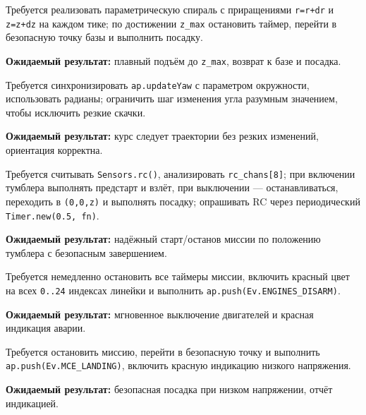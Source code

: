 \begin{taskbox}
Требуется реализовать параметрическую спираль с приращениями \texttt{r=r+dr} и \texttt{z=z+dz} на каждом тике; по достижении \texttt{z\_max} остановить таймер, перейти в безопасную точку базы и выполнить посадку.

\textbf{Ожидаемый результат:} плавный подъём до \texttt{z\_max}, возврат к базе и посадка.
\end{taskbox}

\begin{taskbox}
Требуется синхронизировать \texttt{ap.updateYaw} с параметром окружности, использовать радианы; ограничить шаг изменения угла разумным значением, чтобы исключить резкие скачки.

\textbf{Ожидаемый результат:} курс следует траектории без резких изменений, ориентация корректна.
\end{taskbox}

\begin{taskbox}
Требуется считывать \texttt{Sensors.rc()}, анализировать \texttt{rc\_chans[8]}; при включении тумблера выполнять предстарт и взлёт, при выключении — останавливаться, переходить в \texttt{(0,0,z)} и выполнять посадку; опрашивать RC через периодический \texttt{Timer.new(0.5, fn)}.

\textbf{Ожидаемый результат:} надёжный старт/останов миссии по положению тумблера с безопасным завершением.
\end{taskbox}

\begin{taskbox}
Требуется немедленно остановить все таймеры миссии, включить красный цвет на всех \texttt{0..24} индексах линейки и выполнить \texttt{ap.push(Ev.ENGINES\_DISARM)}.

\textbf{Ожидаемый результат:} мгновенное выключение двигателей и красная индикация аварии.
\end{taskbox}

\begin{taskbox}
Требуется остановить миссию, перейти в безопасную точку и выполнить \texttt{ap.push(Ev.MCE\_LANDING)}, включить красную индикацию низкого напряжения.

\textbf{Ожидаемый результат:} безопасная посадка при низком напряжении, отчёт индикацией.
\end{taskbox}

